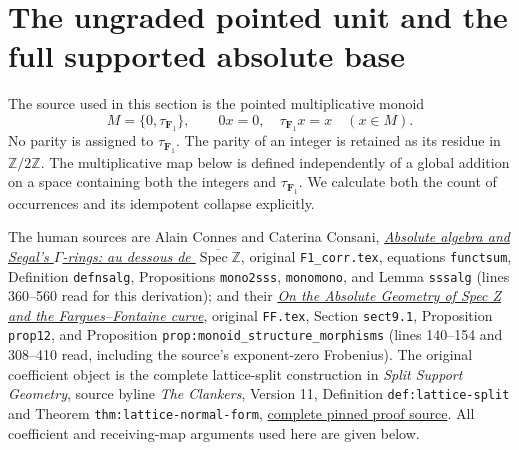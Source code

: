 \section{The ungraded pointed unit and the full supported absolute base}
\label{sec:fgm}

The source used in this section is the pointed multiplicative monoid
\begin{equation}\tag{FGM1}
 M=\{0,\tau_{\mathbf F_1}\},\qquad
 0x=0,\quad \tau_{\mathbf F_1}x=x\quad(x\in M).
\end{equation}
No parity is assigned to $\tau_{\mathbf F_1}$. The parity of an integer
is retained as its residue in $\mathbb Z/2\mathbb Z$. The multiplicative
map below is defined independently of a global addition on a space
containing both the integers and $\tau_{\mathbf F_1}$. We calculate both
the count of occurrences and its idempotent collapse explicitly.

The human sources are Alain Connes and Caterina Consani,
\href{https://arxiv.org/abs/1502.05585v2}{\emph{Absolute algebra and
Segal's $\Gamma$-rings: au dessous de $\overline{\operatorname{Spec}
\mathbb Z}$}}, original \nolinkurl{F1_corr.tex}, equations
\texttt{functsum}, Definition \texttt{defnsalg}, Propositions
\texttt{mono2sss}, \texttt{monomono}, and Lemma \texttt{sssalg}
(lines 360--560 read for this derivation); and their
\href{https://arxiv.org/abs/2606.06604v1}{\emph{On the Absolute Geometry
of Spec Z and the Fargues--Fontaine curve}}, original \nolinkurl{FF.tex},
Section \texttt{sect9.1}, Proposition \texttt{prop12}, and Proposition
\texttt{prop:monoid\_structure\_morphisms} (lines 140--154 and
308--410 read, including the source's exponent-zero Frobenius).
The original coefficient object is the complete lattice-split construction
in \emph{Split Support Geometry}, source byline \emph{The Clankers},
Version 11, Definition \texttt{def:lattice-split} and Theorem
\texttt{thm:lattice-normal-form},
\href{https://github.com/KokunoYumeto/zeta-function-research-reader/blob/a2851f9eb352e7e4376bc629de86fa4ed9c1c434/workbenches/splitzero-tandem/foundations/split-support-geometry-v11/split_support_geometry_arithmetic_curve_v11.tex}{complete pinned proof source}.
All coefficient and receiving-map arguments used here are given below.

